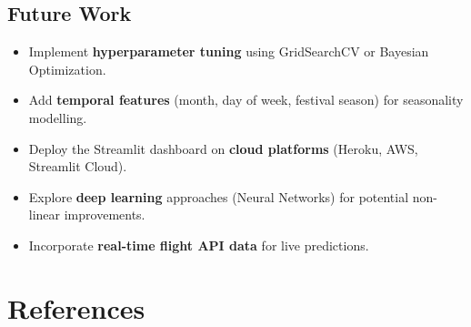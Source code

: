 \documentclass[12pt, a4paper]{article}
\begin{document}
\subsection{Future Work}

\begin{itemize}[leftmargin=*]
    \item Implement \textbf{hyperparameter tuning} using GridSearchCV or Bayesian Optimization.
    \item Add \textbf{temporal features} (month, day of week, festival season) for seasonality modelling.
    \item Deploy the Streamlit dashboard on \textbf{cloud platforms} (Heroku, AWS, Streamlit Cloud).
    \item Explore \textbf{deep learning} approaches (Neural Networks) for potential non-linear improvements.
    \item Incorporate \textbf{real-time flight API data} for live predictions.
\end{itemize}

\newpage

\section{References}
\end{document}

